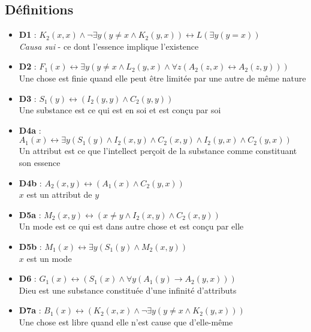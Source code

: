 \documentclass[11pt,a4paper]{article}
\begin{document}
\subsection{Définitions}
\begin{itemize}
    \item \textbf{D1} : $K_2(x,x) \land \neg \exists y (y \neq x \land K_2(y,x)) \leftrightarrow L(\exists y (y = x))$ \\
    \textit{Causa sui} - ce dont l'essence implique l'existence
    
    \item \textbf{D2} : $F_1(x) \leftrightarrow \exists y (y \neq x \land L_2(y,x) \land \forall z (A_2(z,x) \leftrightarrow A_2(z,y)))$ \\
    Une chose est finie quand elle peut être limitée par une autre de même nature
    
    \item \textbf{D3} : $S_1(y) \leftrightarrow (I_2(y,y) \land C_2(y,y))$ \\
    Une substance est ce qui est en soi et est conçu par soi
    
    \item \textbf{D4a} : $A_1(x) \leftrightarrow \exists y (S_1(y) \land I_2(x,y) \land C_2(x,y) \land I_2(y,x) \land C_2(y,x))$ \\
    Un attribut est ce que l'intellect perçoit de la substance comme constituant son essence
    
    \item \textbf{D4b} : $A_2(x,y) \leftrightarrow (A_1(x) \land C_2(y,x))$ \\
    $x$ est un attribut de $y$
    
    \item \textbf{D5a} : $M_2(x,y) \leftrightarrow (x \neq y \land I_2(x,y) \land C_2(x,y))$ \\
    Un mode est ce qui est dans autre chose et est conçu par elle
    
    \item \textbf{D5b} : $M_1(x) \leftrightarrow \exists y (S_1(y) \land M_2(x,y))$ \\
    $x$ est un mode
    
    \item \textbf{D6} : $G_1(x) \leftrightarrow (S_1(x) \land \forall y (A_1(y) \rightarrow A_2(y,x)))$ \\
    Dieu est une substance constituée d'une infinité d'attributs
    
    \item \textbf{D7a} : $B_1(x) \leftrightarrow (K_2(x,x) \land \neg \exists y (y \neq x \land K_2(y,x)))$ \\
    Une chose est libre quand elle n'est cause que d'elle-même
    

\end{itemize}
\end{document}
